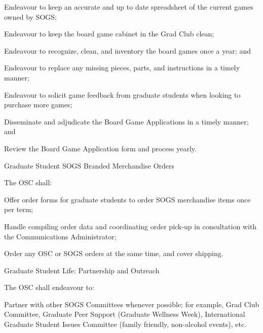 \begin{longenum}[ label*=\thesubsection.\arabic*., align=left]
\begin{longenum}[label*=\arabic*., align=left]
\begin{longenum}[label*=\arabic*., align=left]
			\item Endeavour to keep an accurate and up to date spreadsheet of the current games owned by SOGS;
			\item Endeavour to keep the board game cabinet in the Grad Club clean;
			\item Endeavour to recognize, clean, and inventory the board games once a year; and
				\begin{longenum}[label*=\arabic*., align=left]
				\item Endeavour to replace any missing pieces, parts, and instructions in a timely manner;
				\end{longenum}
			\item Endeavour to solicit game feedback from graduate students when looking to purchase more games;
			\item Disseminate and adjudicate the Board Game Applications in a timely manner; and
			\item Review the Board Game Application form and process yearly.
			\end{longenum}
		\end{longenum}
	\item Graduate Student SOGS Branded Merchandise Orders
		\begin{longenum}[label*=\arabic*., align=left]
		\item The OSC shall:
			\begin{longenum}[label*=\arabic*., align=left]
			\item Offer order forms for graduate students to order SOGS merchandise items once per term;
			\item Handle compiling order data and coordinating order pick-up in consultation with the Communications Administrator;
			\item Order any OSC or SOGS orders at the same time, and cover shipping.
			\end{longenum}
		\end{longenum}
	\item Graduate Student Life: Partnership and Outreach
		\begin{longenum}[label*=\arabic*., align=left]
		\item The OSC shall endeavour to:
			\begin{longenum}[label*=\arabic*., align=left]
			\item Partner with other SOGS Committees whenever possible; for example, Grad Club Committee, Graduate Peer Support (Graduate Wellness Week), International Graduate Student Issues Committee (family friendly, non-alcohol events), etc.

\end{longenum}
\end{longenum}
\end{longenum}
